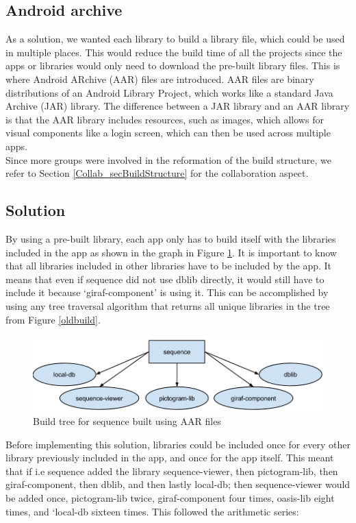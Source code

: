 \subsection{Android archive}
As a solution, we wanted each library to build a library file, which could be used in multiple places. This would reduce the build time of all the projects since the apps or libraries would only need to download the pre-built library files.
This is where Android ARchive (AAR) files are introduced. AAR files are binary distributions of an Android Library Project, which works like a standard Java Archive (JAR) library. The difference between a JAR library and an AAR library is that the AAR library includes resources, such as images, which allows for visual components like a login screen, which can then be used across multiple apps.\\
Since more groups were involved in the reformation of the build structure, we refer to Section \ref{Collab_secBuildStructure} for the collaboration aspect.

\subsection{Solution}
By using a pre-built library, each app only has to build itself with the libraries included in the app as shown in the graph in Figure \ref{newbuild}. It is important to know that all libraries included in other libraries have to be included by the app. It means that even if sequence did not use dblib directly, it would still have to include it because ‘giraf-component’ is using it. This can be accomplished by using any tree traversal algorithm that returns all unique libraries in the tree from Figure \ref{oldbuild}.

\begin{figure}[H]
	\centering
	\includegraphics[width=0.8 \textwidth]{pictures/newbuild.png}
	\caption{Build tree for sequence built using AAR files}
	\label{newbuild}
\end{figure}

Before implementing this solution, libraries could be included once for every other library previously included in the app, and once for the app itself. This meant that if i.e sequence added the library sequence-viewer, then pictogram-lib, then giraf-component, then dblib, and then lastly local-db; then sequence-viewer would be added once, pictogram-lib twice, giraf-component four times, oasis-lib eight times, and ‘local-db sixteen times. This followed the arithmetic series:

